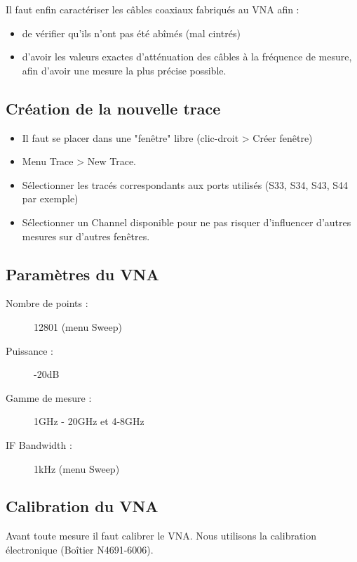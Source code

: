 Il faut enfin caractériser les câbles coaxiaux fabriqués au VNA afin :
\begin{itemize}
    \item de vérifier qu'ils n'ont pas été abîmés (mal cintrés)
    \item d'avoir les valeurs exactes d'atténuation des câbles à la fréquence de mesure, afin d'avoir une mesure la plus précise possible.
\end{itemize}

\subsection{Création de la nouvelle trace}
\begin{itemize}
    \item Il faut se placer dans une "fenêtre" libre (clic-droit > Créer fenêtre)
    \item Menu Trace > New Trace.
    \item Sélectionner les tracés correspondants aux ports utilisés (S33, S34, S43, S44 par exemple)
    \item Sélectionner un Channel disponible pour ne pas risquer d'influencer d'autres mesures sur d'autres fenêtres.
\end{itemize}

\subsection{Paramètres du VNA}
\begin{description}
    \item[Nombre de points :] 12801 (menu Sweep)
    \item[Puissance :] -20dB
    \item[Gamme de mesure :] 1GHz - 20GHz et 4-8GHz
    \item[IF Bandwidth :] 1kHz (menu Sweep)
\end{description}

\subsection{Calibration du VNA}
Avant toute mesure il faut calibrer le VNA. Nous utilisons la calibration électronique (Boîtier N4691-6006).
